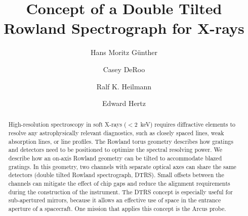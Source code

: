\documentclass[linenumbers]{aastex631}
\begin{document}
\title{Concept of a Double Tilted Rowland Spectrograph for X-rays}





\author[0000-0003-4243-2840]{Hans Moritz G{\"u}nther}
\author[0000-0002-9184-4561]{Casey DeRoo}
\author[0000-0001-9980-5295]{Ralf K. Heilmann}
\author[0000-0002-6747-9648]{Edward Hertz}


\begin{abstract}
High-resolution spectroscopy in soft X-rays ($<2$~keV) requires diffractive elements to resolve any astrophysically relevant diagnostics, such as closely spaced lines, weak absorption lines, or line profiles. The Rowland torus geometry describes how gratings and detectors need to be positioned to optimize the spectral resolving power. We describe how an on-axis Rowland geometry can be tilted to accommodate blazed gratings. In this geometry, two channels with separate optical axes can share the same detectors (double tilted Rowland spectrograph, DTRS). Small offsets between the channels can mitigate the effect of chip gaps and reduce the alignment requirements during the construction of the instrument. The DTRS concept is especially useful for sub-apertured mirrors, because it allows an effective use of space in the entrance aperture of a spacecraft.
One mission that applies this concept is the Arcus probe.

\end{abstract}
\end{document}
